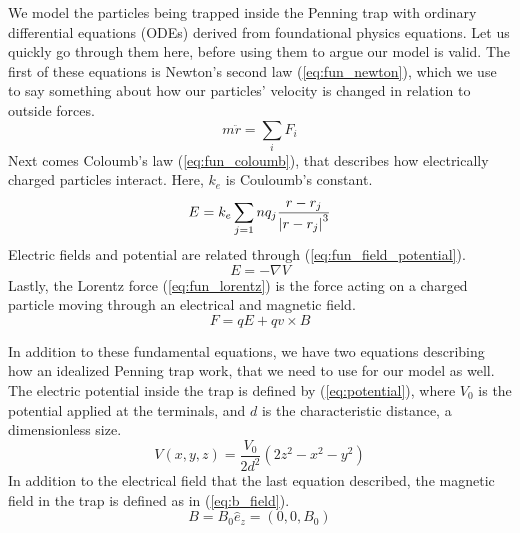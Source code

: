 We model the particles being trapped inside the Penning trap with ordinary differential equations (ODEs) derived from foundational physics equations. Let us quickly go through them here, before using them to argue our model is valid. The first of these equations is Newton's second law (\ref{eq:fun_newton}), which we use to say something about how our particles' velocity is changed in relation to outside forces.
%
\begin{equation}
\label{eq:fun_newton}
m \ddot r = \sum_i F_i
\end{equation}
%
Next comes Coloumb's law (\ref{eq:fun_coloumb}), that describes how electrically charged particles interact. Here, $k_e$ is Couloumb's constant.
%
\begin{equation}
\label{eq:fun_coloumb}
E = k_e \sum_{j=1}n q_j \frac{r - r_j}{\abs{r - r_j}^3}
\end{equation}
%
Electric fields and potential are related through (\ref{eq:fun_field_potential}).
\begin{equation}
\label{eq:fun_field_potential}
E = - \nabla V
\end{equation}
%
Lastly, the Lorentz force (\ref{eq:fun_lorentz}) is the force acting on a charged particle moving through an electrical and magnetic field.
%
\begin{equation}
\label{eq:fun_lorentz}
F = qE + qv \times B 
\end{equation}


In addition to these fundamental equations, we have two equations describing how an idealized Penning trap work, that we need to use for our model as well. The electric potential inside the trap is defined by (\ref{eq:potential}), where $V_0$ is the potential applied at the terminals, and $d$ is the characteristic distance, a dimensionless size.
%
\begin{equation}
\label{eq:potential}
V(x, y, z) = \frac{V_0}{2d^2}(2z^2 - x^2 - y^2)
\end{equation}
%
In addition to the electrical field that the last equation described, the magnetic field in the trap is defined as in (\ref{eq:b_field}).
%
\begin{equation}
\label{eq:b_field}
B = B_0 \hat{e}_z = (0, 0, B_0)
\end{equation}

